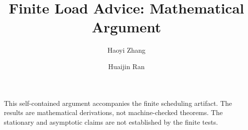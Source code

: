 \documentclass[11pt]{article}
\title{Finite Load Advice: Mathematical Argument}
\author{Haoyi Zhang \and Huaijin Ran}
\date{}
\theoremstyle{remark}
\numberwithin{equation}{section}
\begin{document}
\maketitle
This self-contained argument accompanies the finite scheduling artifact.
The results are mathematical derivations, not machine-checked theorems.
The stationary and asymptotic claims are not established by the finite tests.











\end{document}
